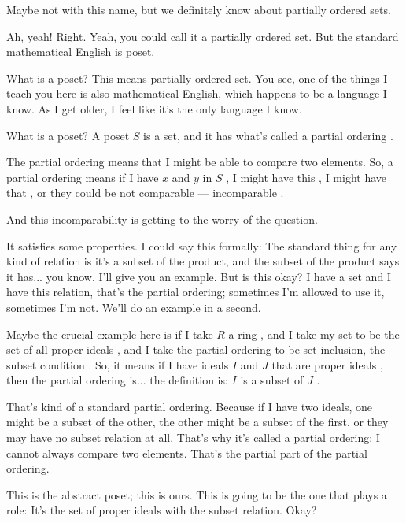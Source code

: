 \begin{student}
Maybe not with this name, but we definitely know about partially ordered sets.
\end{student}

\begin{speech}[00:27:04 - 00:28:38]
Ah, yeah! Right. Yeah, you could call it a partially ordered set. But the standard mathematical English is poset.

What is a poset?  This means partially ordered set. You see, one of the things I teach you here is also mathematical English, which happens to be a language I know. As I get older, I feel like it's the only language I know. 

What is a poset? A poset $S$ is a set, and it has what's called a partial ordering .

The partial ordering means that I might be able to compare two elements. So, a partial ordering means if I have $x$ and $y$ in $S$ , I might have this , I might have that , or they could be not comparable  --- incomparable .

And this incomparability is getting to the worry of the question.

It satisfies some properties. I could say this formally: The standard thing for any kind of relation is it's a subset of the product, and the subset of the product says it has... you know. I'll give you an example. But is this okay? I have a set and I have this relation, that's the partial ordering; sometimes I'm allowed to use it, sometimes I'm not. We'll do an example in a second.
\end{speech}

\begin{speech}[00:28:38 - 00:29:58]
Maybe the crucial example here is if I take $R$ a ring , and I take my set to be the set of all proper ideals , and I take the partial ordering to be set inclusion, the subset condition . So, it means if I have ideals $I$ and $J$ that are proper ideals , then the partial ordering is... the definition is: $I$ is a subset of $J$ .

That's kind of a standard partial ordering. Because if I have two ideals, one might be a subset of the other, the other might be a subset of the first, or they may have no subset relation at all. That's why it's called a partial ordering: I cannot always compare two elements. That's the partial part of the partial ordering.

This is the abstract poset; this is ours. This is going to be the one that plays a role: It's the set of proper ideals with the subset relation. Okay?
\end{speech}

